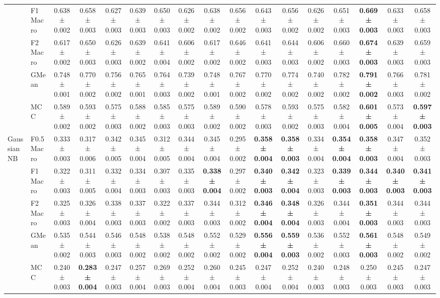 \begin{table}[H]
{\begin{tabular}{llccccccccccccccc}
 & F1 Macro & 0.638 ± 0.002 & 0.658 ± 0.003 & 0.627 ± 0.003 & 0.639 ± 0.003 & 0.650 ± 0.003 & 0.626 ± 0.002 & 0.638 ± 0.002 & 0.656 ± 0.002 & 0.643 ± 0.003 & 0.656 ± 0.002 & 0.626 ± 0.002 & 0.651 ± 0.003 & \textbf{0.669 ± 0.003} & 0.633 ± 0.003 & 0.658 ± 0.003 \\
 & F2 Macro & 0.617 ± 0.002 & 0.650 ± 0.003 & 0.626 ± 0.003 & 0.639 ± 0.002 & 0.641 ± 0.004 & 0.606 ± 0.002 & 0.617 ± 0.002 & 0.646 ± 0.002 & 0.641 ± 0.003 & 0.644 ± 0.003 & 0.606 ± 0.002 & 0.660 ± 0.003 & \textbf{0.674 ± 0.003} & 0.639 ± 0.003 & 0.659 ± 0.003 \\
 & GMean & 0.748 ± 0.001 & 0.770 ± 0.002 & 0.756 ± 0.002 & 0.765 ± 0.001 & 0.764 ± 0.003 & 0.739 ± 0.002 & 0.748 ± 0.001 & 0.767 ± 0.002 & 0.770 ± 0.002 & 0.774 ± 0.002 & 0.740 ± 0.002 & 0.782 ± 0.002 & \textbf{0.791 ± 0.002} & 0.766 ± 0.003 & 0.781 ± 0.002 \\
 & MCC & 0.589 ± 0.002 & 0.593 ± 0.002 & 0.575 ± 0.003 & 0.588 ± 0.002 & 0.585 ± 0.003 & 0.575 ± 0.003 & 0.589 ± 0.002 & 0.590 ± 0.002 & 0.578 ± 0.003 & 0.593 ± 0.002 & 0.575 ± 0.003 & 0.582 ± 0.004 & \textbf{0.601 ± 0.005} & 0.573 ± 0.004 & \textbf{0.597 ± 0.003} \\
\cline{1-17}
\multirow[t]{5}{*}{GaussianNB} & F0.5 Macro & 0.333 ± 0.003 & 0.317 ± 0.006 & 0.342 ± 0.005 & 0.345 ± 0.004 & 0.312 ± 0.005 & 0.344 ± 0.004 & 0.345 ± 0.004 & 0.295 ± 0.002 & \textbf{0.358 ± 0.004} & \textbf{0.358 ± 0.003} & 0.334 ± 0.004 & \textbf{0.354 ± 0.004} & \textbf{0.358 ± 0.003} & 0.347 ± 0.004 & 0.352 ± 0.003 \\
 & F1 Macro & 0.322 ± 0.003 & 0.311 ± 0.005 & 0.332 ± 0.004 & 0.334 ± 0.003 & 0.307 ± 0.003 & 0.335 ± 0.003 & \textbf{0.338 ± 0.004} & 0.297 ± 0.002 & \textbf{0.340 ± 0.003} & \textbf{0.342 ± 0.004} & 0.323 ± 0.003 & \textbf{0.339 ± 0.003} & \textbf{0.344 ± 0.003} & \textbf{0.340 ± 0.003} & \textbf{0.341 ± 0.003} \\
 & F2 Macro & 0.325 ± 0.003 & 0.326 ± 0.004 & 0.338 ± 0.003 & 0.337 ± 0.003 & 0.322 ± 0.002 & 0.337 ± 0.003 & 0.344 ± 0.003 & 0.312 ± 0.002 & \textbf{0.346 ± 0.004} & \textbf{0.348 ± 0.004} & 0.326 ± 0.003 & 0.344 ± 0.004 & \textbf{0.351 ± 0.003} & 0.344 ± 0.003 & 0.344 ± 0.003 \\
 & GMean & 0.535 ± 0.002 & 0.544 ± 0.003 & 0.546 ± 0.003 & 0.548 ± 0.002 & 0.538 ± 0.002 & 0.548 ± 0.002 & 0.552 ± 0.002 & 0.529 ± 0.002 & \textbf{0.556 ± 0.004} & \textbf{0.559 ± 0.003} & 0.536 ± 0.002 & 0.552 ± 0.003 & \textbf{0.561 ± 0.003} & 0.548 ± 0.002 & 0.549 ± 0.002 \\
 & MCC & 0.240 ± 0.003 & \textbf{0.283 ± 0.004} & 0.247 ± 0.003 & 0.257 ± 0.004 & 0.269 ± 0.003 & 0.252 ± 0.004 & 0.260 ± 0.004 & 0.245 ± 0.003 & 0.247 ± 0.004 & 0.252 ± 0.004 & 0.240 ± 0.003 & 0.248 ± 0.003 & 0.250 ± 0.003 & 0.245 ± 0.003 & 0.247 ± 0.003 \\

\end{tabular}}
\end{table}

